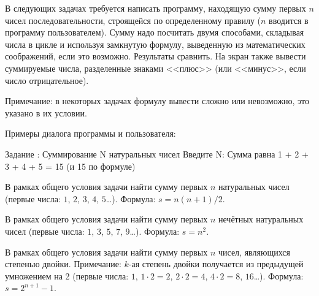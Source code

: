 
В следующих задачах требуется написать программу, находящую сумму первых $n$
чисел последовательности, строящейся по определенному правилу ($n$ вводится в программу
пользователем). Сумму надо посчитать двумя способами, складывая числа в цикле и
используя замкнутую формулу, выведенную из математических соображений, если это возможно. %
Результаты сравнить. На экран также вывести
суммируемые числа, разделенные знаками <<плюс>> (или <<минус>>, если число
отрицательное).

Примечание: в некоторых задачах формулу вывести сложно или невозможно, это
указано в их условии. %

Примеры диалога программы и пользователя:

\begin{zzoutput}
  Задание : Суммирование N натуральных чисел
  Введите N: 
  Сумма равна 1 + 2 + 3 + 4 + 5 = 15 (и 15 по формуле)
\end{zzoutput}


\bigskip


\begin{zztask}
В рамках общего условия задачи найти сумму первых $n$ натуральных чисел
(первые числа: $1$, $2$, $3$, $4$, $5$\dots).
Формула: $s = n(n+1)/2$.
\end{zztask}


\begin{zztask}
В рамках общего условия задачи найти сумму первых $n$ нечётных натуральных 
чисел (первые числа: $1$, $3$, $5$, $7$, $9$\dots).
Формула: $s = n^2$.
\end{zztask}


\begin{zztask}
В рамках общего условия задачи найти сумму первых $n$ чисел, являющихся
степенью двойки. Примечание: $k$-ая степень двойки получается из предыдущей
умножением на 2 (первые числа: $1$, $1\cdot2=2$, $2\cdot2=4$, $4\cdot2=8$, 
$16$\dots).
Формула: $s = 2^{n+1}-1$.
\end{zztask}

